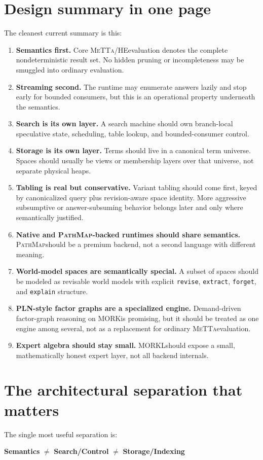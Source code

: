\documentclass[11pt]{article}
\newcommand{\MeTTa}{\textsc{MeTTa}}
\newcommand{\PathMap}{\textsc{PathMap}}
\newcommand{\MORK}{\textsc{MORK}}
\newcommand{\MORKL}{\textsc{MORKL}}
\newcommand{\HE}{\textsc{HE}}
\begin{document}
\section{Design summary in one page}
The cleanest current summary is this:
\begin{enumerate}
    \item \textbf{Semantics first.} Core \MeTTa/\HE evaluation denotes the complete nondeterministic result set. No hidden pruning or incompleteness may be smuggled into ordinary evaluation.
    \item \textbf{Streaming second.} The runtime may enumerate answers lazily and stop early for bounded consumers, but this is an operational property underneath the semantics.
    \item \textbf{Search is its own layer.} A search machine should own branch-local speculative state, scheduling, table lookup, and bounded-consumer control.
    \item \textbf{Storage is its own layer.} Terms should live in a canonical term universe. Spaces should usually be views or membership layers over that universe, not separate physical heaps.
    \item \textbf{Tabling is real but conservative.} Variant tabling should come first, keyed by canonicalized query plus revision-aware space identity. More aggressive subsumptive or answer-subsuming behavior belongs later and only where semantically justified.
    \item \textbf{Native and \PathMap-backed runtimes should share semantics.} \PathMap should be a premium backend, not a second language with different meaning.
    \item \textbf{World-model spaces are semantically special.} A subset of spaces should be modeled as revisable world models with explicit \texttt{revise}, \texttt{extract}, \texttt{forget}, and \texttt{explain} structure.
    \item \textbf{PLN-style factor graphs are a specialized engine.} Demand-driven factor-graph reasoning on \MORK is promising, but it should be treated as one engine among several, not as a replacement for ordinary \MeTTa evaluation.
    \item \textbf{Expert algebra should stay small.} \MORKL should expose a small, mathematically honest expert layer, not all backend internals.
\end{enumerate}

\section{The architectural separation that matters}
The single most useful separation is:
\begin{center}
\textbf{Semantics} $\neq$ \textbf{Search/Control} $\neq$ \textbf{Storage/Indexing}
\end{center}
\end{document}
